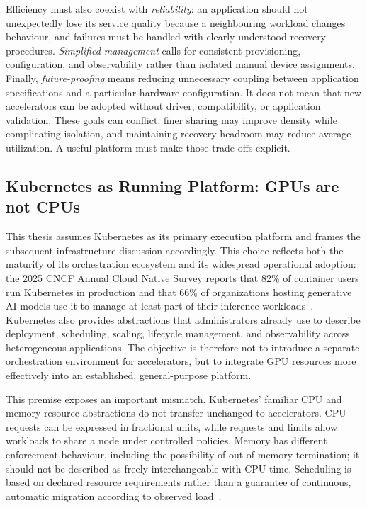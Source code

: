 Efficiency must also coexist with \emph{reliability}: an application should not unexpectedly lose its service quality because a neighbouring workload changes behaviour, and failures must be handled with clearly understood recovery procedures. \emph{Simplified management} calls for consistent provisioning, configuration, and observability rather than isolated manual device assignments. Finally, \emph{future-proofing} means reducing unnecessary coupling between application specifications and a particular hardware configuration. It does not mean that new accelerators can be adopted without driver, compatibility, or application validation. These goals can conflict: finer sharing may improve density while complicating isolation, and maintaining recovery headroom may reduce average utilization. A useful platform must make those trade-offs explicit.

\subsection{Kubernetes as Running Platform: GPUs are not CPUs}
\label{subsec:kubernetes-running-platform}
This thesis assumes Kubernetes as its primary execution platform and frames the subsequent infrastructure discussion accordingly. This choice reflects both the maturity of its orchestration ecosystem and its widespread operational adoption: the 2025 CNCF Annual Cloud Native Survey reports that 82\% of container users run Kubernetes in production and that 66\% of organizations hosting generative AI models use it to manage at least part of their inference workloads~\cite{cncf2026annualsurvey}. Kubernetes also provides abstractions that administrators already use to describe deployment, scheduling, scaling, lifecycle management, and observability across heterogeneous applications. The objective is therefore not to introduce a separate orchestration environment for accelerators, but to integrate GPU resources more effectively into an established, general-purpose platform.

This premise exposes an important mismatch. Kubernetes' familiar CPU and memory resource abstractions do not transfer unchanged to accelerators. CPU requests can be expressed in fractional units, while requests and limits allow workloads to share a node under controlled policies. Memory has different enforcement behaviour, including the possibility of out-of-memory termination; it should not be described as freely interchangeable with CPU time. Scheduling is based on declared resource requirements rather than a guarantee of continuous, automatic migration according to observed load~\cite{kubernetes135resources}.


